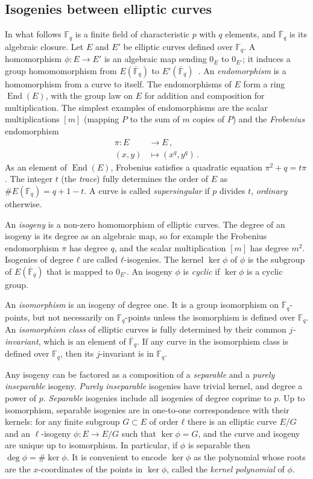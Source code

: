 \documentclass{llncs}
\newcommand{\F}{\mathbb{F}}
\newcommand{\Fbar}{\overline{\mathbb{F}}}
\DeclareMathOperator{\End}{End}
\begin{document}
\subsection{Isogenies between elliptic curves}
\label{sec:isogeny}

In what follows $\F_q$ is a finite field of characteristic $p$ with
$q$ elements, and $\Fbar_q$ is its algebraic closure. Let $E$ and $E'$
be elliptic curves defined over $\F_q$. 
A homomorphism $ϕ:E→E'$ is an
algebraic map sending $0_E$ to $0_{E'}$;
it induces a group homomomorphism from
$E(\Fbar_q)$ to $E'(\Fbar_q)$~\cite[III.4]{silverman:elliptic}.
An \emph{endomorphism} is a homomorphism from a curve to itself.
The endomorphisms of $E$ form a ring $\End(E)$,
with the group law on $E$ for addition
and composition for multiplication.
The simplest examples of endomorphisms
are the scalar multiplications $[m]$
(mapping $P$ to the sum of $m$ copies of $P$)
and the \emph{Frobenius} endomorphism
\begin{align*}
  π : E &\longrightarrow E \,, \\
  (x,y) &\longmapsto (x^q,y^q) \,.
\end{align*}
As an element of $\End(E)$, Frobenius satisfies a quadratic equation
$π^2 + q = tπ$.  The integer $t$ (the \emph{trace})
fully determines the order of $E$ as $\#E(\F_q)=q+1-t$. A curve is
called \emph{supersingular} if $p$ divides $t$, \emph{ordinary}
otherwise.

An \emph{isogeny} is a non-zero homomorphism of elliptic curves.
The
degree of an isogeny is its degree as an algebraic map,
so for example the Frobenius endomorphism $\pi$ has degree $q$,
and the scalar multiplication $[m]$ has degree $m^2$.
Isogenies of degree $ℓ$ are called $ℓ$-isogenies.
The kernel $\ker ϕ$ of $\phi$
is the subgroup of $E(\Fbar_q)$ that is
mapped to $0_{E'}$. 
An isogeny $ϕ$ is \emph{cyclic} 
if $\ker ϕ$ is a cyclic group.

An \emph{isomorphism} is an isogeny of degree one. It is a
group isomorphism on $\Fbar_q$-points, but not necessarily on $\F_q$-points
unless the isomorphism is defined over $\F_q$. 
An \emph{isomorphism class} of elliptic curves is
fully determined by their common \emph{$j$-invariant}, which is an
element of $\Fbar_q$. If any curve in the isomorphism class is defined
over $\F_q$, then its $j$-invariant is in $\F_q$.

Any isogeny can be factored as a composition of a \emph{separable} and
a \emph{purely inseparable} isogeny. \emph{Purely inseparable}
isogenies have trivial kernel, and degree a power of $p$.
\emph{Separable} isogenies include all
isogenies of degree coprime to $p$.
Up to isomorphism, separable isogenies
are in one-to-one correspondence with their kernels:
for any finite subgroup $G⊂E$ of order $ℓ$ there is 
an elliptic curve $E/G$ and an $\ell$-isogeny $\phi: E \to E/G$
such that $\ker \phi = G$,
and the curve and isogeny are unique up to isomorphism.
In particular, if $\phi$ is separable then $\deg ϕ=\#\ker ϕ$.
It is convenient to encode $\ker\phi$ as
the polynomial whose roots are the $x$-coordinates of the points
in $\ker\phi$, called the \emph{kernel polynomial} of $\phi$.
\end{document}
